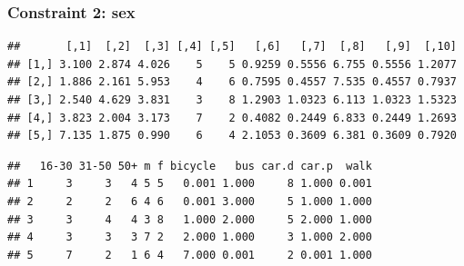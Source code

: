 \subsubsection{Constraint 2: sex}

\begin{Shaded}
\begin{Highlighting}[]
\NormalTok{:}
    \NormalTok{weights2[}\NormalTok{), j] <- all.msim[j, }\NormalTok{]/USd.agg1[j, }\NormalTok{]}
    \NormalTok{weights2[}\NormalTok{), j] <- all.msim[j, }\NormalTok{]/USd.agg1[j, }\NormalTok{]}
\NormalTok{\}}

\NormalTok{:}
    \NormalTok{(USd.cat * weights0[, i] * weights1[, i] * weights2[, }
        \NormalTok{i])}
\NormalTok{\}}
\end{Highlighting}
\end{Shaded}
\begin{verbatim}
##       [,1]  [,2]  [,3] [,4] [,5]   [,6]   [,7]  [,8]   [,9]  [,10]
## [1,] 3.100 2.874 4.026    5    5 0.9259 0.5556 6.755 0.5556 1.2077
## [2,] 1.886 2.161 5.953    4    6 0.7595 0.4557 7.535 0.4557 0.7937
## [3,] 2.540 4.629 3.831    3    8 1.2903 1.0323 6.113 1.0323 1.5323
## [4,] 3.823 2.004 3.173    7    2 0.4082 0.2449 6.833 0.2449 1.2693
## [5,] 7.135 1.875 0.990    6    4 2.1053 0.3609 6.381 0.3609 0.7920
\end{verbatim}
\begin{Shaded}
\begin{Highlighting}[]
\end{Highlighting}
\end{Shaded}
\begin{verbatim}
##   16-30 31-50 50+ m f bicycle   bus car.d car.p  walk
## 1     3     3   4 5 5   0.001 1.000     8 1.000 0.001
## 2     2     2   6 4 6   0.001 3.000     5 1.000 1.000
## 3     3     4   4 3 8   1.000 2.000     5 2.000 1.000
## 4     3     3   3 7 2   2.000 1.000     3 1.000 2.000
## 5     7     2   1 6 4   7.000 0.001     2 0.001 1.000
\end{verbatim}
\begin{Shaded}
\begin{Highlighting}[]
\NormalTok{(}\NormalTok{(}\NormalTok{(} \NormalTok{, }
     \NormalTok{)}
\NormalTok{(} \NormalTok{, } \NormalTok{)}
\end{Highlighting}
\end{Shaded}
